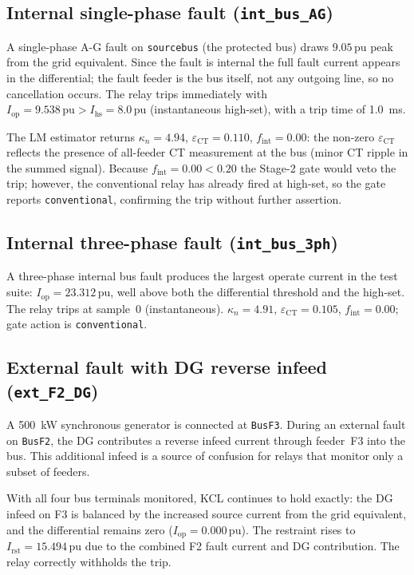\documentclass[12pt,a4paper]{article}
\newcommand{\kappan}{\kappa_n}
\newcommand{\Iop}{I_{\mathrm{op}}}
\newcommand{\Irst}{I_{\mathrm{rst}}}
\newcommand{\fint}{f_{\mathrm{int}}}
\newcommand{\eCT}{\varepsilon_{\mathrm{CT}}}
\begin{document}
\subsection{Internal single-phase fault (\texttt{int\_bus\_AG})}
\label{sec:intAG}

A single-phase A-G fault on \texttt{sourcebus} (the protected bus) draws
$9.05\,\mathrm{pu}$ peak from the grid equivalent.  Since the fault is internal
the full fault current appears in the differential; the fault feeder is the
bus itself, not any outgoing line, so no cancellation occurs.  The relay trips
immediately with $\Iop = 9.538\,\mathrm{pu} > I_{\mathrm{hs}} = 8.0\,\mathrm{pu}$
(instantaneous high-set), with a trip time of \SI{1.0}{\milli\second}.

The LM estimator returns $\kappan = 4.94$, $\eCT = 0.110$, $\fint = 0.00$:
the non-zero $\eCT$ reflects the presence of all-feeder CT measurement at the
bus (minor CT ripple in the summed signal).  Because $\fint = 0.00 < 0.20$ the
Stage-2 gate would veto the trip; however, the conventional relay has already
fired at high-set, so the gate reports \texttt{conventional}, confirming the
trip without further assertion.

\subsection{Internal three-phase fault (\texttt{int\_bus\_3ph})}
\label{sec:int3ph}

A three-phase internal bus fault produces the largest operate current in the
test suite: $\Iop = 23.312\,\mathrm{pu}$, well above both the differential
threshold and the high-set.  The relay trips at sample~0 (instantaneous).
$\kappan = 4.91$, $\eCT = 0.105$, $\fint = 0.00$; gate action is
\texttt{conventional}.

\subsection{External fault with DG reverse infeed (\texttt{ext\_F2\_DG})}
\label{sec:dg}

A \SI{500}{\kilo\watt} synchronous generator is connected at \texttt{BusF3}.
During an external fault on \texttt{BusF2}, the DG contributes a reverse
infeed current through feeder~F3 into the bus.  This additional infeed is a
source of confusion for relays that monitor only a subset of feeders.

With all four bus terminals monitored, KCL continues to hold exactly: the DG
infeed on F3 is balanced by the increased source current from the grid
equivalent, and the differential remains zero ($\Iop = 0.000\,\mathrm{pu}$).
The restraint rises to $\Irst = 15.494\,\mathrm{pu}$ due to the combined F2
fault current and DG contribution.  The relay correctly withholds the trip.
\end{document}
